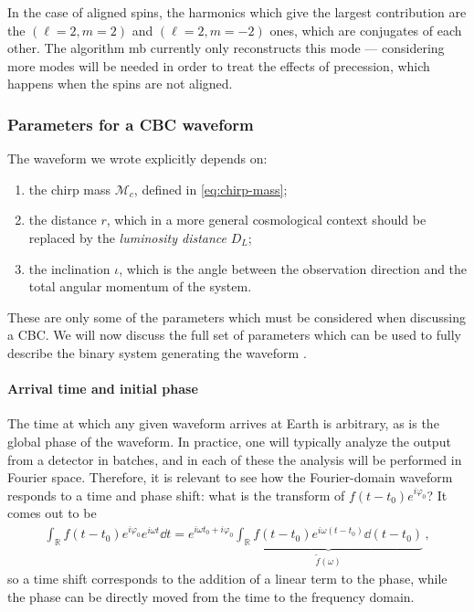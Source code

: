 \documentclass[main.tex]{subfiles}
\begin{document}
In the case of aligned spins, the harmonics which give the largest contribution are the \((\ell = 2, m = 2)\) and \((\ell = 2, m =-2)\) ones, which are conjugates of each other. 
The algorithm \ac{mb} currently only reconstructs this mode ---
considering more modes will be needed in order to treat the effects of precession, which happens when the spins are not aligned. 


\subsubsection{Parameters for a \ac{CBC} waveform}

The waveform we wrote explicitly depends on: 
\begin{enumerate}
    \item the chirp mass \(\mathcal{M}_c\), defined in \eqref{eq:chirp-mass};
    \item the distance \(r\), which in a more general cosmological context should be replaced by the \emph{luminosity distance} \(D_L\);
    \item the inclination \(\iota \), which is the angle between the observation direction and the total angular momentum of the system.
\end{enumerate}

These are only some of the parameters which must be considered when discussing a \ac{CBC}. We will now discuss the full set of parameters which can be used to fully describe the binary system generating the waveform \cite[eq.\ 21]{breschiTtBajesBayesian2021}. 

\paragraph{Arrival time and initial phase}

The time at which any given waveform arrives at Earth is arbitrary, as is the global phase of the waveform. 
In practice, one will typically analyze the output from a detector in batches, and in each of these the analysis will be performed in Fourier space. 
Therefore, it is relevant to see how the Fourier-domain waveform responds to a time and phase shift: what is the transform of \(f(t-t_0 ) e^{i \varphi_0} \)? It comes out to be 
%
\begin{align}
\int_{\mathbb{R}} f(t-t_0 ) e^{i \varphi_0 } e^{i \omega t} \dd{t}  = e^{i \omega t_0 + i \varphi_0} \underbrace{\int_{\mathbb{R}} f(t-t_0 ) e^{i \omega (t-t_0 )} \dd{(t-t_0 )}}_{\widetilde{f}(\omega )}
\,,
\end{align}
%
so a time shift corresponds to the addition of a linear term to the phase, while the phase can be directly moved from the time to the frequency domain. 
\end{document}
